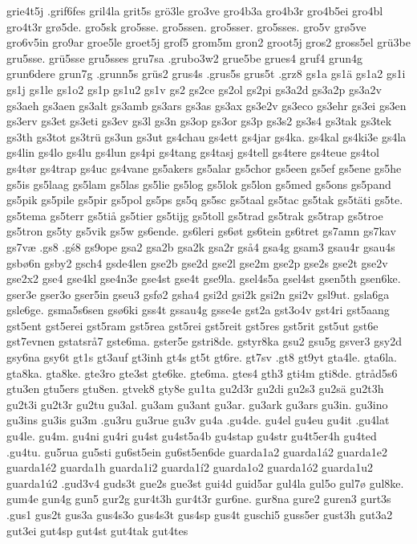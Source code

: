 grie4t5j
.grif6fes
gril4la
grit5s
grö3le
gro3ve
gro4b3a
gro4b3r
gro4b5ei
gro4bl
gro4t3r
grø5de.
gro5sk
gro5sse.
gro5ssen.
gro5sser.
gro5sses.
gro5v
grø5ve
gro6v5in
gro9ar
groe5le
groet5j
grof5
grom5m
gron2
groot5j
gros2
gross5el
grü3be
gru5sse.
grü5sse
gru5sses
gru7sa
.grubo3w2
grue5be
grues4
gruf4
grun4g
grun6dere
grun7g
.grunn5s
grüs2
grus4s
.grus5s
grus5t
.grz8
gs1a
gs1ä
gs1a2
gs1i
gs1j
gs1le
gs1o2
gs1p
gs1u2
gs1v
gs2
gs2ce
gs2ol
gs2pi
gs3a2d
gs3a2p
gs3a2v
gs3aeh
gs3aen
gs3alt
gs3amb
gs3ars
gs3as
gs3ax
gs3e2v
gs3eco
gs3ehr
gs3ei
gs3en
gs3erv
gs3et
gs3eti
gs3ev
gs3l
gs3n
gs3op
gs3or
gs3p
gs3s2
gs3s4
gs3tak
gs3tek
gs3th
gs3tot
gs3trü
gs3un
gs3ut
gs4chau
gs4ett
gs4jar
gs4ka.
gs4kal
gs4ki3e
gs4la
gs4lin
gs4lo
gs4lu
gs4lun
gs4pi
gs4tang
gs4tasj
gs4tell
gs4tere
gs4teue
gs4tol
gs4tør
gs4trap
gs4uc
gs4vane
gs5akers
gs5alar
gs5chor
gs5een
gs5ef
gs5ene
gs5he
gs5is
gs5laag
gs5lam
gs5las
gs5lie
gs5log
gs5lok
gs5lon
gs5med
gs5ons
gs5pand
gs5pik
gs5pile
gs5pir
gs5pol
gs5ps
gs5q
gs5sc
gs5taal
gs5tac
gs5tak
gs5täti
gs5te.
gs5tema
gs5terr
gs5tiå
gs5tier
gs5tijg
gs5toll
gs5trad
gs5trak
gs5trap
gs5troe
gs5tron
gs5ty
gs5vik
gs5w
gs6ende.
gs6leri
gs6øt
gs6tein
gs6tret
gs7amn
gs7kav
gs7væ
.gs8
.gś8
gs9ope
gsa2
gsa2b
gsa2k
gsa2r
gså4
gsa4g
gsam3
gsau4r
gsau4s
gsbø6n
gsby2
gsch4
gsde4len
gse2b
gse2d
gse2l
gse2m
gse2p
gse2s
gse2t
gse2v
gse2x2
gse4
gse4kl
gse4n3e
gse4st
gse4t
gse9la.
gsel4s5a
gsel4st
gsen5th
gsen6ke.
gser3e
gser3o
gser5in
gseu3
gsfø2
gsha4
gsi2d
gsi2k
gsi2n
gsi2v
gsl9ut.
gsla6ga
gsle6ge.
gsma5s6sen
gsø6ki
gss4t
gssau4g
gsse4e
gst2a
gst3o4v
gst4ri
gst5aang
gst5ent
gst5erei
gst5ram
gst5rea
gst5rei
gst5reit
gst5res
gst5rit
gst5ut
gst6e
gst7evnen
gstatsrå7
gste6ma.
gster5e
gstri8de.
gstyr8ka
gsu2
gsu5g
gsver3
gsy2d
gsy6na
gsy6t
gt1s
gt3auf
gt3inh
gt4s
gt5t
gt6re.
gt7sv
.gt8
gt9yt
gta4le.
gta6la.
gta8ka.
gta8ke.
gte3ro
gte3st
gte6ke.
gte6ma.
gtes4
gth3
gti4m
gti8de.
gtråd5s6
gtu3en
gtu5ers
gtu8en.
gtvek8
gty8e
gu1ta
gu2d3r
gu2di
gu2s3
gu2sä
gu2t3h
gu2t3i
gu2t3r
gu2tu
gu3al.
gu3am
gu3ant
gu3ar.
gu3ark
gu3ars
gu3in.
gu3ino
gu3ins
gu3is
gu3m
.gu3ru
gu3rue
gu3v
gu4a
.gu4de.
gu4el
gu4eu
gu4it
.gu4lat
gu4le.
gu4m.
gu4ni
gu4ri
gu4st
gu4st5a4b
gu4stap
gu4str
gu4t5er4h
gu4ted
.gu4tu.
gu5rua
gu5sti
gu6st5ein
gu6st5en6de
guarda1a2
guarda1á2
guarda1e2
guarda1é2
guarda1h
guarda1i2
guarda1í2
guarda1o2
guarda1ó2
guarda1u2
guarda1ú2
.gud3v4
guds3t
gue2s
gue3st
gui4d
guid5ar
gul4la
gul5o
gul7ø
gul8ke.
gum4e
gun4g
gun5
gur2g
gur4t3h
gur4t3r
gur6ne.
gur8na
gure2
guren3
gurt3s
.gus1
gus2t
gus3a
gus4s3o
gus4s3t
gus4sp
gus4t
guschi5
guss5er
gust3h
gut3a2
gut3ei
gut4sp
gut4st
gut4tak
gut4tes
